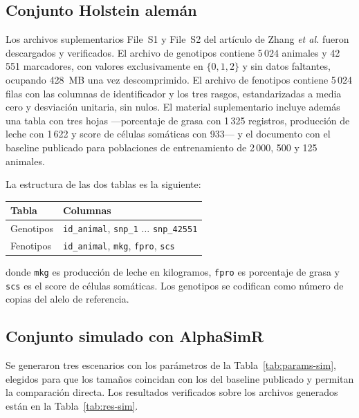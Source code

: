 \documentclass[conference]{IEEEtran}
\begin{document}
\subsection{Conjunto Holstein alemán}

Los archivos suplementarios File~S1 y File~S2 del artículo de Zhang
\textit{et al.} \cite{zhang2015} fueron descargados y verificados. El
archivo de genotipos contiene 5\,024 animales y 42\,551 marcadores, con
valores exclusivamente en $\{0, 1, 2\}$ y sin datos faltantes, ocupando
428~MB una vez descomprimido. El archivo de fenotipos contiene 5\,024
filas con las columnas de identificador y los tres rasgos, estandarizadas
a media cero y desviación unitaria, sin nulos. El material suplementario
incluye además una tabla con tres hojas —porcentaje de grasa con 1\,325
registros, producción de leche con 1\,622 y score de células somáticas con
933— y el documento con el baseline publicado para poblaciones de
entrenamiento de 2\,000, 500 y 125 animales.

La estructura de las dos tablas es la siguiente:

\begin{center}
\footnotesize
\begin{tabular}{@{}ll@{}}
\toprule
\textbf{Tabla} & \textbf{Columnas} \\
\midrule
Genotipos & \texttt{id\_animal}, \texttt{snp\_1} $\ldots$
  \texttt{snp\_42551} \\
Fenotipos & \texttt{id\_animal}, \texttt{mkg}, \texttt{fpro},
  \texttt{scs} \\
\bottomrule
\end{tabular}
\end{center}

donde \texttt{mkg} es producción de leche en kilogramos, \texttt{fpro} es
porcentaje de grasa y \texttt{scs} es el score de células somáticas. Los
genotipos se codifican como número de copias del alelo de referencia.

\subsection{Conjunto simulado con AlphaSimR}

Se generaron tres escenarios con los parámetros de la
Tabla~\ref{tab:params-sim}, elegidos para que los tamaños coincidan con
los del baseline publicado y permitan la comparación directa. Los
resultados verificados sobre los archivos generados están en la
Tabla~\ref{tab:res-sim}.
\end{document}
